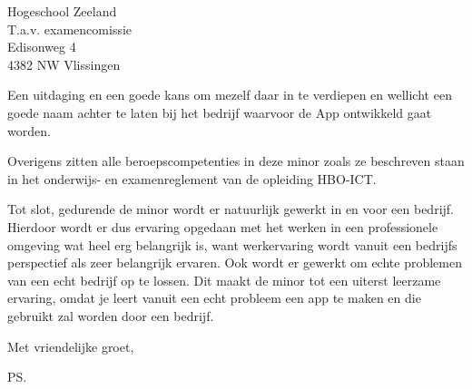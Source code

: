 \documentclass{letter}
\begin{document}
\begin{letter}{Hogeschool Zeeland \\ T.a.v. examencomissie \\ Edisonweg 4 \\ 4382 NW Vlissingen}
\newline

Een uitdaging en een goede kans om mezelf daar in te verdiepen en wellicht een goede naam achter te laten bij het bedrijf waarvoor de App ontwikkeld gaat worden. 

\newline

Overigens zitten alle beroepscompetenties in deze minor zoals ze beschreven staan in het onderwijs- en examenreglement van de opleiding HBO-ICT.

\newline

Tot slot, gedurende de minor wordt er natuurlijk gewerkt in en voor een bedrijf. Hierdoor wordt er dus ervaring opgedaan met het werken in een professionele omgeving wat heel erg belangrijk is, want werkervaring wordt vanuit een bedrijfs perspectief als zeer belangrijk ervaren. Ook wordt er gewerkt om echte problemen van een echt bedrijf op te lossen. Dit maakt de minor tot een uiterst leerzame ervaring, omdat je leert vanuit een echt probleem een app te maken en die gebruikt zal worden door een bedrijf.


\closing{Met vriendelijke groet, }
\ps

\end{letter}
\end{document}
